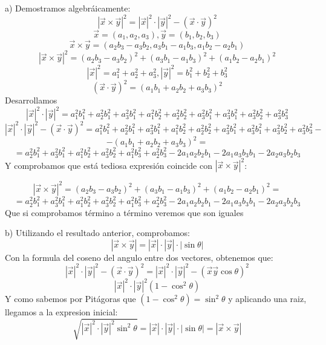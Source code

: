 \documentclass[12pt,a4paper,oneside,onecolumn]{article}
\begin{document}
 
    \section{}
    a)
    Demostramos algebr\'aicamente:
    \[
        |\vec{x} \times \vec{y}|^2 = |\vec{x}|^2 \cdot |\vec{y}|^2 - (\vec{x} \cdot \vec{y})^2 
    \]
    \[
        \vec{x} = (a_1, a_2, a_3), \vec{y} = (b_1, b_2, b_3)
    \]
    \[
        \vec{x} \times \vec{y} = (a_2b_3 - a_3b_2, a_3b_1 - a_1b_3,a_1b_2 - a_2b_1)
    \]
    \[
        |\vec{x} \times \vec{y}|^2 = (a_2b_3 - a_3b_2)^2 + (a_3b_1 - a_1b_3)^2 + (a_1b_2 - a_2b_1)^2
    \]
    \[
        |\vec{x}|^2 = a_1^2 + a_2^2 + a_3^2,    
        |\vec{y}|^2 = b_1^2 + b_2^2 + b_3^2
    \]
    \[
        (\vec{x} \cdot \vec{y})^2 = (a_1b_1 +a_2b_2 + a_3b_3)^2
    \]
    Desarrollamos
    \[
        |\vec{x}|^2 \cdot |\vec{y}|^2 = a_1^2b_1^2 + a_2^2b_1^2 + a_3^2b_1^2 + a_1^2b_2^2 + a_2^2b_2^2 + a_3^2b_1^2 + a_3^2b_1^2 + a_3^2b_2^2 + a_3^2b_3^2 
    \]
    \[
        |\vec{x}|^2 \cdot |\vec{y}|^2 - (\vec{x} \cdot \vec{y})^2 = a_1^2b_1^2 + a_2^2b_1^2 + a_3^2b_1^2 + a_1^2b_2^2 + a_2^2b_2^2 + a_3^2b_1^2 + a_3^2b_1^2 + a_3^2b_2^2 + a_3^2b_3^2 -
    \]
    \[
        - (a_1b_1 +a_2b_2 + a_3b_3)^2 = 
    \]
    \[
        = a_2^2b_1^2 + a_3^2b_1^2 +a_1^2b_2^2 + a_3^2b_2^2 +a_1^2b_3^2 +a_2^2b_3^2 - 2a_1a_2b_2b_1 - 2a_1a_3b_3b_1 - 2a_2a_3b_2b_3
    \]
    Y comprobamos que est\'a tediosa expresi\'on coincide con $|\vec{x} \times \vec{y}|^2$:
    
    \[
        |\vec{x} \times \vec{y}|^2 = (a_2b_3 - a_3b_2)^2 + (a_3b_1 - a_1b_3)^2 + (a_1b_2 - a_2b_1)^2 =
    \]
    \[
        = a_2^2b_1^2 + a_3^2b_1^2 +a_1^2b_2^2 + a_3^2b_2^2 +a_1^2b_3^2 +a_2^2b_3^2 - 2a_1a_2b_2b_1 - 2a_1a_3b_3b_1 - 2a_2a_3b_2b_3
    \]
    Que si comprobamos t\'ermino a t\'ermino veremos que son iguales 
    
    b) Utilizando el resultado anterior, comprobamos:
    \[
        |\vec{x} \times \vec{y}| = |\vec{x}| \cdot |\vec{y}|\cdot |\sin{\theta}|
    \]
    Con la formula del coseno del angulo entre dos vectores, obtenemos que:
    \[
    |\vec{x}|^2 \cdot |\vec{y}|^2 - (\vec{x} \cdot \vec{y})^2 =  |\vec{x}|^2 \cdot |\vec{y}|^2 - (\vec{x}\vec{y}\cos{\theta})^2
    \]
    \[
        |\vec{x}|^2 \cdot |\vec{y}|^2 (1 - \cos^2{\theta})
    \]
    Y como sabemos por Pit\'agoras que $(1 - \cos^2{\theta}) = \sin^2{\theta}$ y aplicando una raiz, llegamos a la expresion inicial:
    \[
        \sqrt{|\vec{x}|^2 \cdot |\vec{y}|^2 \sin^2{\theta}}  = |\vec{x}| \cdot |\vec{y}|\cdot |\sin{\theta}| = |\vec{x} \times \vec{y}|
    \]
    
    \section{}
    
    \section{}
    
     \section{}
     
	
\end{document}
